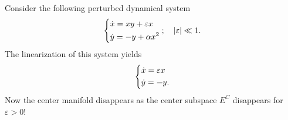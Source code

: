 \begin{ex}
	Consider the following perturbed dynamical system
	\begin{align}
		\begin{dcases}
			\dot{x} = xy + \varepsilon x \\
			\dot{y} = -y + \alpha x^2
		\end{dcases}
;\quad |\varepsilon | \ll 1.
	\end{align}
The linearization of this system yields
\begin{align}
	\begin{dcases}
		\dot{x} = \varepsilon x \\
		\dot{y} = -y.
	\end{dcases}
\end{align}
Now the center manifold disappears as the center subspace $E^{C}$ disappears for $\varepsilon>0$!
\end{ex}

